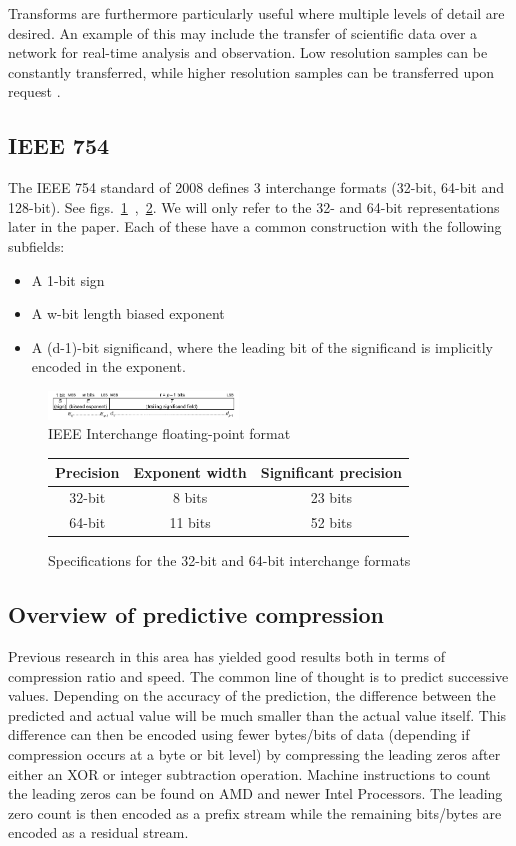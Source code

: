 \documentclass{acm_proc_article-sp}
\begin{document}
Transforms are furthermore particularly useful where multiple levels of detail are desired. An example of this may include the transfer of scientific data over a network 
for real-time analysis and observation. Low resolution samples can be constantly transferred, while higher resolution samples can be transferred upon request \cite{Tao:1994:PTS:951087.951108}.
\subsection{IEEE 754}
The IEEE 754 standard of 2008 defines 3 interchange formats (32-bit, 64-bit and 128-bit). See figs.~\ref{IEEE_FLOAT}~,~\ref{IEEE_FLOAT_TAB}. We will only refer to the 32- and 64-bit representations later in the paper.  
Each of these have a common construction with the following subfields:
\begin{itemize}
 \item A 1-bit sign
 \item A w-bit length biased exponent
 \item A (d-1)-bit significand, where the leading bit of the significand is implicitly encoded in the exponent.
\end{itemize}
\begin{figure}[h!]
 \centering
 \includegraphics[width=0.45\textwidth]{IEEEinterchangeFormat.png}
 \caption{IEEE Interchange floating-point format \cite{4610935}}
 \label{IEEE_FLOAT}
\end{figure}
\begin{figure}[h!]
\centering
\begin{tabular}{|c|c|c|}
 \hline
 Precision & Exponent width & Significant precision \\
 \hline
 32-bit & 8 bits & 23 bits \\
 \hline
 64-bit & 11 bits & 52 bits \\
 \hline
\end{tabular}
\caption{Specifications for the 32-bit and 64-bit interchange formats}
 \label{IEEE_FLOAT_TAB}
\end{figure}
\subsection{Overview of predictive compression}
Previous research \cite{1607248,4589203,engelson2000lossless,lindstrom2006fast,O'Neil:2011:FDC:1964179.1964189,4976448} in this area has yielded good results both in terms of compression ratio and speed. 
The common line of thought is to predict successive values. Depending on the accuracy of the prediction, the difference between the predicted and actual value will be much smaller than the actual value itself. 
This difference can then be encoded using fewer bytes/bits of data (depending if compression occurs at a byte or bit level) by compressing the leading zeros after either an XOR or integer subtraction 
operation. Machine instructions to count the leading zeros can be found on AMD and newer Intel Processors. The leading zero count is then encoded as a prefix stream while the remaining bits/bytes 
are encoded as a residual stream.
\end{document}
